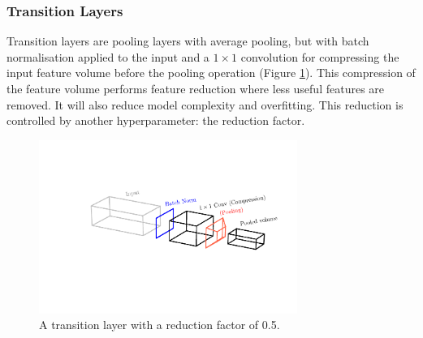 \subsubsection{Transition Layers}
Transition layers are pooling layers with average pooling, but with batch normalisation applied to the input and a $1\times{}1$ convolution for compressing the input feature volume before the pooling operation (Figure \ref{fig:machine_learning:transition_layer}). 
This compression of the feature volume performs feature reduction where less useful features are removed. It will also reduce model complexity and overfitting. This reduction is controlled by another hyperparameter: the reduction factor. 
\begin{figure}[h!]
    \centering
    \includegraphics[width=0.75\textwidth]{figures/machine_learning/transition_layer.pdf}
    \caption{A transition layer with a reduction factor of 0.5.}
        \label{fig:machine_learning:transition_layer}
\end{figure}


